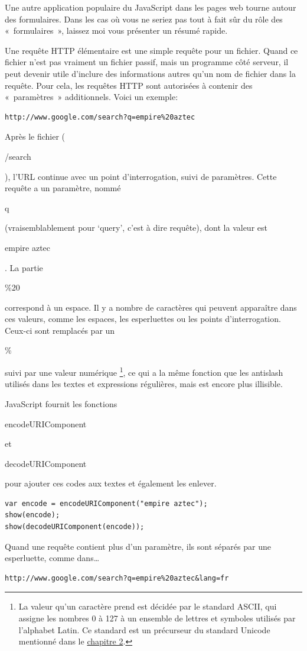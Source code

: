 \documentclass{FramateX}
\renewcommand{\texttt}[1]{\begin{sffamily}{#1}\end{sffamily}}
\begin{document}
\begin{center}\end{center}

Une autre application populaire du JavaScript dans les pages web tourne
autour des formulaires. Dans les cas où vous ne seriez pas tout à fait
sûr du rôle des «~formulaires~», laissez moi vous présenter un résumé
rapide.

Une requête HTTP élémentaire est une simple requête pour un fichier.
Quand ce fichier n'est pas vraiment un fichier passif, mais un programme
côté serveur, il peut devenir utile d'inclure des informations autres
qu'un nom de fichier dans la requête. Pour cela, les requêtes HTTP sont
autorisées à contenir des «~paramètres~» additionnels. Voici un exemple:

\begin{lstlisting}
http://www.google.com/search?q=empire%20aztec
\end{lstlisting}
Après le fichier (\texttt{/search}), l'URL continue avec un point
d'interrogation, suivi de paramètres. Cette requête a un paramètre,
nommé \texttt{q} (vraisemblablement pour `query', c'est à dire requête),
dont la valeur est \texttt{empire aztec}. La partie \texttt{\%20}
correspond à un espace. Il y a nombre de caractères qui peuvent
apparaître dans ces valeurs, comme les espaces, les esperluettes ou les
points d'interrogation. Ceux-ci sont remplacés par un \texttt{\%} suivi
par une valeur numérique \footnote{La valeur qu'un caractère prend est décidée par le standard ASCII, qui assigne les nombres 0 à 127 à un ensemble de lettres et symboles utilisés par l'alphabet Latin. Ce standard est un précurseur du standard Unicode mentionné dans le \href{chapter2.html}{chapitre 2}.}, ce qui a la même
fonction que les antislash utilisés dans les textes et expressions
régulières, mais est encore plus illisible.

JavaScript fournit les fonctions \texttt{encodeURIComponent} et
\texttt{decodeURIComponent} pour ajouter ces codes aux textes et
également les enlever.

\begin{lstlisting}
var encode = encodeURIComponent("empire aztec");
show(encode);
show(decodeURIComponent(encode));
\end{lstlisting}
Quand une requête contient plus d'un paramètre, ils sont séparés par une
esperluette, comme dans\ldots{}

\begin{lstlisting}
http://www.google.com/search?q=empire%20aztec&lang=fr
\end{lstlisting}
\begin{center}\end{center}
\end{document}
